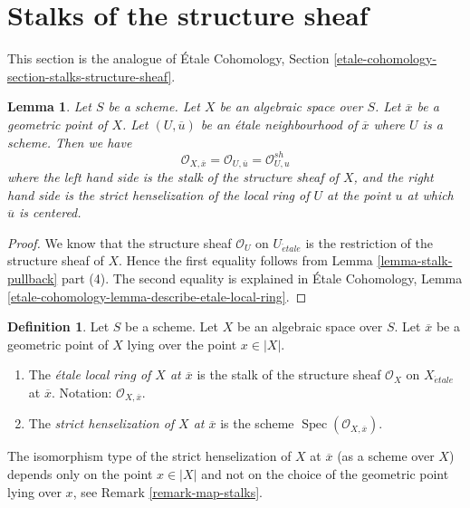 \documentclass{stacks-project}
\theoremstyle{plain}
\newtheorem{lemma}[subsection]{Lemma}
\theoremstyle{definition}
\newtheorem{definition}[subsection]{Definition}
\theoremstyle{remark}
\numberwithin{equation}{subsection}
\def\Spec{\mathop{\mathrm{Spec}}}
\def\etale{{\acute{e}tale}}
\begin{document}
\section{Stalks of the structure sheaf}
\label{section-stalks-structure-sheaf}

\noindent
This section is the analogue of
\'Etale Cohomology, Section
\ref{etale-cohomology-section-stalks-structure-sheaf}.

\begin{lemma}
\label{lemma-describe-etale-local-ring}
Let $S$ be a scheme.
Let $X$ be an algebraic space over $S$.
Let $\overline{x}$ be a geometric point of $X$.
Let $(U, \overline{u})$ be an \'etale neighbourhood of $\overline{x}$
where $U$ is a scheme. Then we have
$$
\mathcal{O}_{X, \overline{x}} =
\mathcal{O}_{U, \overline{u}} =
\mathcal{O}_{U, u}^{sh}
$$
where the left hand side is the stalk of the structure sheaf of $X$,
and the right hand side is the strict henselization of the local ring
of $U$ at the point $u$ at which $\overline{u}$ is centered.
\end{lemma}

\begin{proof}
We know that the structure sheaf $\mathcal{O}_U$ on
$U_\etale$ is the restriction of the structure sheaf of $X$.
Hence the first equality follows from
Lemma \ref{lemma-stalk-pullback} part (4).
The second equality is explained in
\'Etale Cohomology,
Lemma \ref{etale-cohomology-lemma-describe-etale-local-ring}.
\end{proof}

\begin{definition}
\label{definition-etale-local-rings}
Let $S$ be a scheme.
Let $X$ be an algebraic space over $S$.
Let $\overline{x}$ be a geometric point of $X$ lying over the point
$x \in |X|$.
\begin{enumerate}
\item The {\it \'etale local ring of $X$ at $\overline{x}$}
is the stalk of the structure sheaf $\mathcal{O}_X$ on $X_\etale$
at $\overline{x}$.
Notation: $\mathcal{O}_{X, \overline{x}}$.
\item The {\it strict henselization of $X$ at $\overline{x}$}
is the scheme $\Spec(\mathcal{O}_{X, \overline{x}})$.
\end{enumerate}
\end{definition}

\noindent
The isomorphism type of the strict henselization of $X$ at $\overline{x}$
(as a scheme over $X$) depends only on the point $x \in |X|$ and not on
the choice of the geometric point lying over $x$, see
Remark \ref{remark-map-stalks}.
\end{document}
